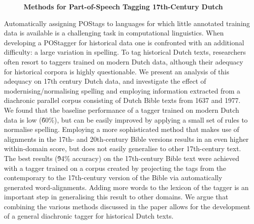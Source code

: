 \documentclass[10pt, a4paper, twopage, headinclude, footinclude, BCOR5mm]{scrartcl}
\begin{document}
{{\newpage

\begin{figure}[t!]
\centering
\large\textbf{Methods for Part-of-Speech Tagging 17th-Century Dutch}
\vspace*{0.5cm}
\end{figure}


        \begin{table}[t!]
    \end{table}

\noindent
Automatically assigning POStags to languages for which little annotated training data is available is a challenging task in computational linguistics. When developing a POStagger for historical data one is confronted with an additional difficulty: a large variation in spelling. To tag historical Dutch texts, researchers often resort to taggers trained on modern Dutch data, although their adequacy for historical corpora is highly questionable. We present an analysis of this adequacy on 17th century Dutch data, and investigate the effect of modernising/normalising spelling and employing information extracted from a diachronic parallel corpus consisting of Dutch Bible texts from 1637 and 1977. We found that the baseline performance of a tagger trained on modern Dutch data is low (\~60\%), but can be easily improved by applying a small set of rules to normalise spelling. Employing a more sophisticated method that makes use of alignments in the 17th- and 20th-century Bible versions results in an even higher within-domain score, but does not easily generalise to other 17th-century text. The best results (\~94\% accuracy) on the 17th-century Bible text were achieved with a tagger trained on a corpus created by projecting the tags from the contemporary to the 17th-century version of the Bible via automatically generated word-alignments. Adding more words to the lexicon of the tagger is an important step in generalising this result to other domains. We argue that combining the various methods discussed in the paper allows for the development of a general diachronic tagger for historical Dutch texts.


}}
\end{document}
